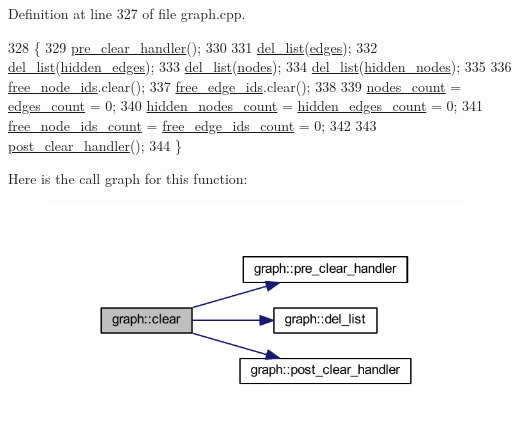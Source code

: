 Definition at line 327 of file graph.\+cpp.


\begin{DoxyCode}
328 \{
329     \mbox{\hyperlink{classgraph_a16ccad78837d16be59854549cd2d847a}{pre\_clear\_handler}}();
330 
331     \mbox{\hyperlink{classgraph_a23f0a5fb311b7d71bb9dfc4e8aedef35}{del\_list}}(\mbox{\hyperlink{classgraph_ab5b1c610cca1bcf72b05aacc28a48153}{edges}});
332     \mbox{\hyperlink{classgraph_a23f0a5fb311b7d71bb9dfc4e8aedef35}{del\_list}}(\mbox{\hyperlink{classgraph_a0d3da33d047ba7cdc3dc68b5d9c84b88}{hidden\_edges}});
333     \mbox{\hyperlink{classgraph_a23f0a5fb311b7d71bb9dfc4e8aedef35}{del\_list}}(\mbox{\hyperlink{classgraph_a4ea0592e8eb7c26c5abad24546907726}{nodes}});
334     \mbox{\hyperlink{classgraph_a23f0a5fb311b7d71bb9dfc4e8aedef35}{del\_list}}(\mbox{\hyperlink{classgraph_a7a3f2842a409a4b35ca8ef34598df9ca}{hidden\_nodes}});
335 
336     \mbox{\hyperlink{classgraph_ae3f535853434924927a21d7725445aab}{free\_node\_ids}}.clear();
337     \mbox{\hyperlink{classgraph_a2bef57ea1db5b5541b3cce866de179f0}{free\_edge\_ids}}.clear();
338 
339     \mbox{\hyperlink{classgraph_a1f59223d0bcf647920963d7a661dd74a}{nodes\_count}} = \mbox{\hyperlink{classgraph_af560ff4263ad165c166a46084e781b4a}{edges\_count}} = 0;
340     \mbox{\hyperlink{classgraph_aa72548d972d226a69f7f8fb92b363860}{hidden\_nodes\_count}} = \mbox{\hyperlink{classgraph_a3151f544e049fbd985204ca9d8f74c97}{hidden\_edges\_count}} = 0;
341     \mbox{\hyperlink{classgraph_a9480e2310fe64c3a8ad295bb3f119772}{free\_node\_ids\_count}} = \mbox{\hyperlink{classgraph_a336be547b5e0ca43b96cf00131e0e1da}{free\_edge\_ids\_count}} = 0;
342     
343     \mbox{\hyperlink{classgraph_a870633528590b7925cd27776bdd2bbd2}{post\_clear\_handler}}();
344 \}
\end{DoxyCode}
Here is the call graph for this function\+:
\nopagebreak
\begin{figure}[H]
\begin{center}
\leavevmode
\includegraphics[width=312pt]{classgraph_a9ff5d6af3653e79f87b836701453f55a_cgraph}
\end{center}
\end{figure}
